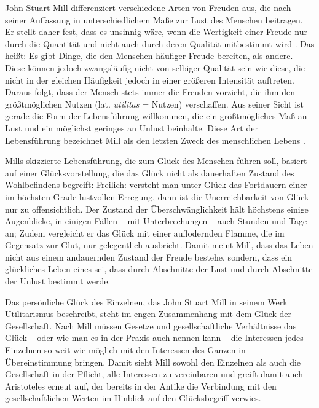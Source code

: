 John Stuart Mill differenziert verschiedene Arten von Freuden aus, die nach seiner Auffassung in unterschiedlichem Maße zur Lust des Menschen beitragen. 
Er stellt daher fest, dass es unsinnig wäre, wenn die Wertigkeit einer Freude nur durch die Quantität und nicht auch durch deren Qualität mitbestimmt wird \cite[S.\,15]{JM94}. 
Das heißt: Es gibt Dinge, die den Menschen häufiger Freude bereiten, als andere. 
Diese können jedoch zwangsläufig nicht von selbiger Qualität sein wie diese, die nicht in der gleichen Häufigkeit jedoch in einer größeren Intensität auftreten. 
Daraus folgt, dass der Mensch stets immer die Freuden vorzieht, die ihm den größtmöglichen Nutzen (lat. \textit{utilitas} = Nutzen) verschaffen. 
Aus seiner Sicht ist gerade die Form der Lebensführung willkommen, die ein größtmögliches Maß an Lust und ein möglichst geringes an Unlust beinhalte. 
Diese Art der Lebensführung bezeichnet Mill als den letzten Zweck des menschlichen Lebens \cite[S.\,21]{JM94}.

Mills skizzierte Lebensführung, die zum Glück des Menschen führen soll, basiert auf einer Glücksvorstellung, die das Glück nicht als dauerhaften Zustand des Wohlbefindens begreift: 
\glqq Freilich: versteht man unter Glück das Fortdauern einer im höchsten Grade lustvollen Erregung, dann ist die Unerreichbarkeit von Glück nur zu offensichtlich. 
Der Zustand der Überschwänglichkeit hält höchstens einige Augenblicke, in einigen Fällen -- mit Unterbrechungen -- auch Stunden und Tage an;\grqq{} \cite[S.\,23]{JM94}
 Zudem vergleicht er das Glück mit einer auflodernden Flamme, die im Gegensatz zur Glut, nur gelegentlich ausbricht. 
 Damit meint Mill, dass das Leben nicht aus einem andauernden Zustand der Freude bestehe, sondern, dass ein glückliches Leben eines sei, dass durch Abschnitte der Lust und durch Abschnitte der Unlust bestimmt werde.
 
Das persönliche Glück des Einzelnen, das John Stuart Mill in seinem Werk \glqq Utilitarismus\grqq{} beschreibt, steht im engen Zusammenhang mit dem Glück der Gesellschaft. 
Nach Mill müssen \glqq Gesetze und gesellschaftliche Verhältnisse das Glück -- oder wie man es in der Praxis auch nennen kann -- die Interessen jedes Einzelnen so weit wie möglich mit den Interessen des Ganzen in Übereinstimmung bringen.\grqq{} \cite[S.\,30]{JM94}
Damit sieht Mill sowohl den Einzelnen als auch die Gesellschaft in der Pflicht, alle Interessen zu vereinbaren und greift damit auch Aristoteles erneut auf, der bereits in der Antike die Verbindung mit den gesellschaftlichen Werten im Hinblick auf den Glücksbegriff verwies.

